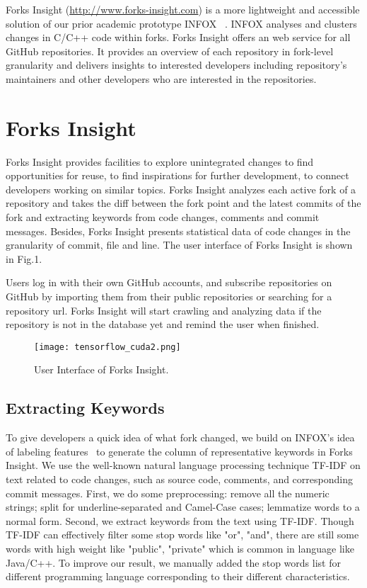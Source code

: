 Forks Insight (\url{http://www.forks-insight.com}) is a more lightweight and accessible solution of our prior academic prototype INFOX ~\cite{ZSLXWK:ICSE18}. INFOX analyses and clusters changes in C/C++ code within forks. Forks Insight offers an web service for all GitHub repositories. It provides an overview of each repository in fork-level granularity and delivers insights to interested developers including repository's maintainers and other developers who are interested in the repositories.

\section{Forks Insight}

Forks Insight provides facilities to explore unintegrated changes to find opportunities for reuse, to find inspirations for further development, to connect developers working on similar topics.
%
Forks Insight analyzes each active fork of a repository and takes the diff between the fork point and the latest commits   of the fork and extracting keywords from code changes, comments and commit messages.
%
Besides, Forks Insight presents statistical data of code changes in the granularity of commit, file and line. The user interface of Forks Insight is shown in Fig.1. 

Users log in with their own GitHub accounts, and subscribe repositories on GitHub by importing them from their public repositories or searching for a repository url. Forks Insight will start crawling and analyzing data if the repository is not in the database yet and remind the user when finished.

\begin{figure*}[ht]
\texttt{[image: tensorflow\_cuda2.png]}
\caption{User Interface of Forks Insight.}
\vspace{-6pt}
\label{GUI}
\end{figure*}

\subsection{Extracting Keywords}
To give developers a quick idea of what fork changed, we build on INFOX's idea of labeling features~\cite{ZSLXWK:ICSE18}
to generate the column of representative keywords in Forks Insight. We use the well-known natural language processing technique TF-IDF \cite{salton1988term} on text related to code changes, such as source code, comments, and corresponding commit messages. First, we do some preprocessing: remove all the numeric strings; split for underline-separated and Camel-Case cases; lemmatize words to a normal form. Second, we extract keywords from the text using TF-IDF. Though TF-IDF can effectively filter some stop words like "or", "and", there are still some words with high weight like "public", "private" which is common in language like Java/C++. To improve our result, we manually added the stop words list for different programming language corresponding to their different characteristics.

